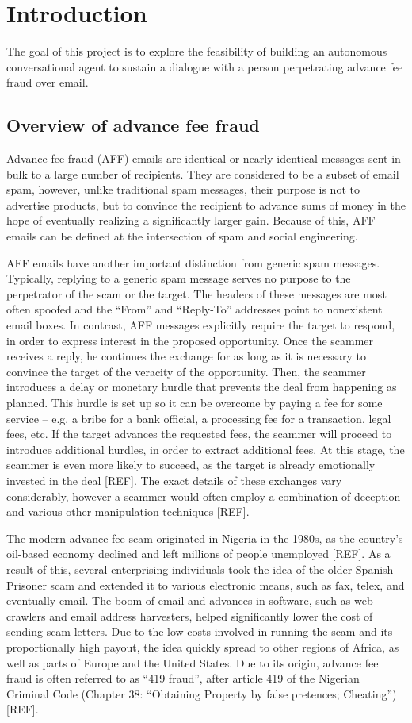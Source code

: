 \chapter{Introduction}
The goal of this project is to explore the feasibility of building an autonomous conversational agent to sustain a dialogue with a person perpetrating advance fee fraud over email.

\section{Overview of advance fee fraud}
Advance fee fraud (AFF) emails are identical or nearly identical messages sent in bulk to a large number of recipients. They are considered to be a subset of email spam, however, unlike traditional spam messages, their purpose is not to advertise products, but to convince the recipient to advance sums of money in the hope of eventually realizing a significantly larger gain. Because of this, AFF emails can be defined at the intersection of spam and social engineering.

AFF emails have another important distinction from generic spam messages. Typically, replying to a generic spam message serves no purpose to the perpetrator of the scam or the target. The headers of these messages are most often spoofed and the “From” and “Reply-To” addresses point to nonexistent email boxes. In contrast, AFF messages explicitly require the target to respond, in order to express interest in the proposed opportunity. Once the scammer receives a reply, he continues the exchange for as long as it is necessary to convince the target of the veracity of the opportunity. Then, the scammer introduces a delay or monetary hurdle that prevents the deal from happening as planned. This hurdle is set up so it can be overcome by paying a fee for some service – e.g. a bribe for a bank official, a processing fee for a transaction, legal fees, etc. If the target advances the requested fees, the scammer will proceed to introduce additional hurdles, in order to extract additional fees. At this stage, the scammer is even more likely to succeed, as the target is already emotionally invested in the deal [REF]. The exact details of these exchanges vary considerably, however a scammer would often employ a combination of deception and various other manipulation techniques [REF].

The modern advance fee scam originated in Nigeria in the 1980s, as the country's oil-based economy declined and left millions of people unemployed [REF]. As a result of this, several enterprising individuals took the idea of the older Spanish Prisoner scam and extended it to various electronic means, such as fax, telex, and eventually email. The boom of email and advances in software, such as web crawlers and email address harvesters, helped significantly lower the cost of sending scam letters. Due to the low costs involved in running the scam and its proportionally high payout, the idea quickly spread to other regions of Africa, as well as parts of Europe and the United States. Due to its origin, advance fee fraud is often referred to as “419 fraud”, after article 419 of the Nigerian Criminal Code (Chapter 38: “Obtaining Property by false pretences; Cheating”) [REF].


